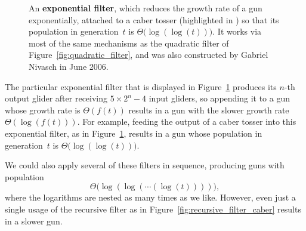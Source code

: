 \begin{figure}[!htb]
	\centering
	\caption{An \textbf{exponential filter}, which reduces the growth rate of a gun exponentially, attached to a caber tosser (highlighted in ) so that its population in generation~$t$ is $\Theta\big(\log(\log(t))\big)$. It works via most of the same mechanisms as the quadratic filter of Figure~\ref{fig:quadratic_filter}, and was also constructed by Gabriel Nivasch in June 2006.}\label{fig:exponential_filter}
\end{figure}

The particular exponential filter that is displayed in Figure~\ref{fig:exponential_filter} produces its $n$-th output glider after receiving $5 \times 2^n - 4$ input gliders, so appending it to a gun whose growth rate is $\Theta(f(t))$ results in a gun with the slower growth rate $\Theta(\log(f(t)))$. For example, feeding the output of a caber tosser into this exponential filter, as in Figure~\ref{fig:exponential_filter}, results in a gun whose population in generation~$t$ is $\Theta\big(\log(\log(t))\big)$.

We could also apply several of these filters in sequence, producing guns with population
\[
	\Theta\big(\log(\log(\cdots (\log(t))))\big),
\]
where the logarithms are nested as many times as we like. However, even just a single usage of the recursive filter as in Figure~\ref{fig:recursive_filter_caber} results in a slower gun.



